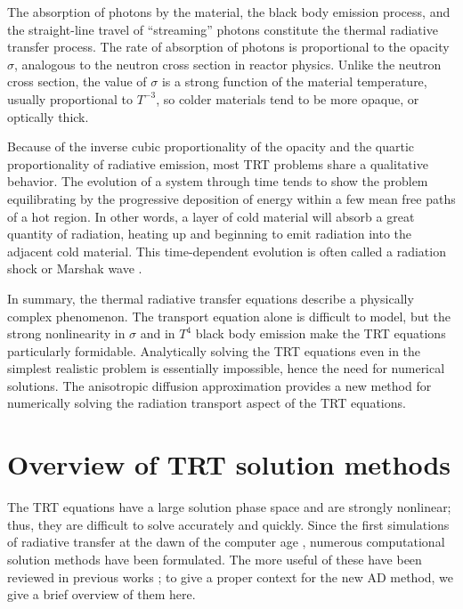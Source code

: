 The absorption of photons by the material, the black body emission process, and
the straight-line travel of ``streaming'' photons constitute the
thermal radiative transfer process. The rate of absorption of photons is
proportional to the opacity $\sigma$, analogous to the neutron cross section in
reactor physics. Unlike the neutron cross section, the value of $\sigma$ is
a strong function of the material temperature, usually proportional to
$T^{-3}$, so colder materials tend to be more opaque, or optically thick.

Because of the inverse cubic proportionality of the opacity and the quartic
proportionality of radiative emission, most TRT problems share a qualitative
behavior.  The evolution of a system through time tends to show the problem
equilibrating by the progressive deposition of energy within a few mean free
paths of a hot region.  In other words, a layer of cold material will absorb
a great quantity of radiation, heating up and beginning to emit radiation
into the adjacent cold material. This time-dependent evolution is often called
a radiation shock or Marshak wave \cite{Mar1958}.

In summary, the thermal radiative transfer equations describe a physically
complex phenomenon.  The transport equation alone is difficult to model, but
the strong nonlinearity in $\sigma$ and in $T^4$ black body emission make the
TRT equations particularly formidable.
Analytically solving the TRT equations even in the simplest realistic problem
is essentially impossible, hence the need for numerical solutions.
The anisotropic diffusion approximation provides a new method for numerically
solving the radiation transport aspect of the TRT equations.

\section{Overview of TRT solution methods}

The TRT equations have
a large solution phase space and are strongly nonlinear; thus,
they are difficult to solve accurately and quickly. Since the first
simulations of radiative transfer at the dawn of the computer age
\cite{Cam1964,Cam1969}, numerous computational solution methods have been
formulated.  The more useful of these have been reviewed in previous
works \cite{Cam1964,Cam1969,Ols2000,Bru2002,Cas2004,Wol2008};
to give a proper context for the new AD method, we give a brief overview of
them here.

